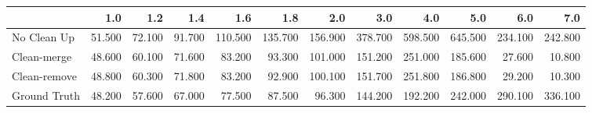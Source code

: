 \begin{tabular}{lrrrrrrrrrrr}
\toprule
{} &    1.0 &    1.2 &    1.4 &     1.6 &     1.8 &     2.0 &     3.0 &     4.0 &     5.0 &     6.0 &     7.0 \\
\midrule
No Clean Up  & 51.500 & 72.100 & 91.700 & 110.500 & 135.700 & 156.900 & 378.700 & 598.500 & 645.500 & 234.100 & 242.800 \\
Clean-merge  & 48.600 & 60.100 & 71.600 &  83.200 &  93.300 & 101.000 & 151.200 & 251.000 & 185.600 &  27.600 &  10.800 \\
Clean-remove & 48.800 & 60.300 & 71.800 &  83.200 &  92.900 & 100.100 & 151.700 & 251.800 & 186.800 &  29.200 &  10.300 \\
Ground Truth & 48.200 & 57.600 & 67.000 &  77.500 &  87.500 &  96.300 & 144.200 & 192.200 & 242.000 & 290.100 & 336.100 \\
\bottomrule
\end{tabular}
